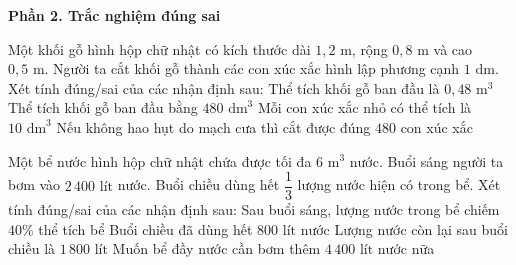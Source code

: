 \textbf{Phần 2. Trắc nghiệm đúng sai}

\begin{ex} %
Một khối gỗ hình hộp chữ nhật có kích thước dài $1{,}2\text{ m}$, rộng $0{,}8\text{ m}$ và cao $0{,}5\text{ m}$. Người ta cắt khối gỗ thành các con xúc xắc hình lập phương cạnh $1\text{ dm}$. Xét tính đúng/sai của các nhận định sau:
\choiceTF
{\True Thể tích khối gỗ ban đầu là $0{,}48\text{ m}^3$}
{\True Thể tích khối gỗ ban đầu bằng $480\text{ dm}^3$}
{Mỗi con xúc xắc nhỏ có thể tích là $10\text{ dm}^3$}
{\True Nếu không hao hụt do mạch cưa thì cắt được đúng $480$ con xúc xắc}
\end{ex}

\begin{ex} %
Một bể nước hình hộp chữ nhật chứa được tối đa $6\text{ m}^3$ nước. Buổi sáng người ta bơm vào $2\,400\text{ lít}$ nước. Buổi chiều dùng hết $\dfrac{1}{3}$ lượng nước hiện có trong bể. Xét tính đúng/sai của các nhận định sau:
\choiceTF
{\True Sau buổi sáng, lượng nước trong bể chiếm $40\%$ thể tích bể}
{\True Buổi chiều đã dùng hết $800\text{ lít}$ nước}
{Lượng nước còn lại sau buổi chiều là $1\,800\text{ lít}$}
{\True Muốn bể đầy nước cần bơm thêm $4\,400\text{ lít}$ nước nữa}
\end{ex}

